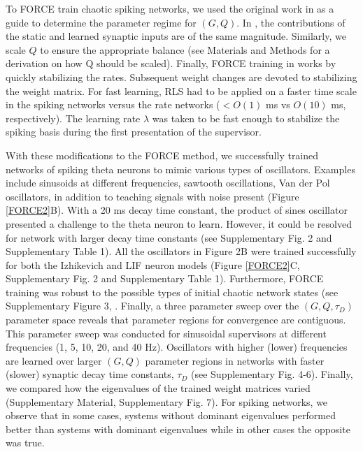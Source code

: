 \documentclass[11pt]{article} %
\begin{document}
To FORCE train chaotic spiking networks, we used the original work in \cite{FORCE1} as a guide to determine the parameter regime for $(G,Q)$.  In \cite{FORCE1}, the contributions of the static and learned synaptic inputs are of the same magnitude. Similarly, we scale $Q$ to ensure the appropriate balance (see Materials and Methods for a derivation on how Q should be scaled).   Finally, FORCE training in \cite{FORCE1} works by quickly stabilizing the rates. Subsequent weight changes are devoted to stabilizing the weight matrix.  For fast learning, RLS had to be applied on a faster time scale in the spiking networks versus the rate networks ($<O(1)$ ms vs $O(10)$ ms, respectively).  The learning rate $\lambda$ was taken to be fast enough to stabilize the spiking basis during the first presentation of the supervisor.


With these modifications to the FORCE method, we successfully trained networks of spiking theta neurons to mimic various types of oscillators.  Examples include sinusoids at different frequencies, sawtooth oscillations, Van der Pol oscillators, in addition to teaching signals with noise present (Figure \ref{FORCE2}B).  With a 20 ms decay time constant, the product of sines oscillator presented a challenge to the theta neuron to learn.  However, it could be resolved for network with larger decay time constants (see Supplementary Fig. 2 and Supplementary Table 1).  All the oscillators in Figure 2B were trained successfully for both the Izhikevich and LIF neuron models (Figure \ref{FORCE2}C, Supplementary Fig. 2 and Supplementary Table 1).    Furthermore, FORCE training was robust to the possible types of initial chaotic network states (see Supplementary Figure 3, \cite{OSTOJIC,Harish}.  Finally, a three parameter sweep over the $(G,Q,\tau_D)$ parameter space reveals that parameter regions for convergence are contiguous.  This parameter sweep was conducted for sinusoidal supervisors at different frequencies (1, 5, 10, 20, and 40 Hz).    Oscillators with higher (lower) frequencies are learned over larger $(G,Q)$ parameter regions in networks with faster (slower) synaptic decay time constants, $\tau_D$ (see Supplementary Fig. 4-6).  Finally, we compared how the eigenvalues of the trained weight matrices varied (Supplementary Material, Supplementary Fig. 7).  For spiking networks, we observe that in some cases, systems without dominant eigenvalues performed better than systems with dominant eigenvalues while in other cases the opposite was true.
\end{document}

